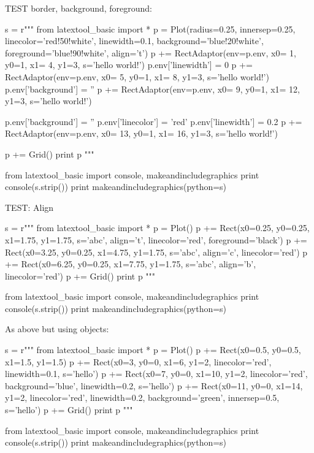 TEST border, background, foreground:
\begin{python}
s = r"""
from latextool_basic import *
p = Plot(radius=0.25, innersep=0.25,
         linecolor='red!50!white', linewidth=0.1,
         background='blue!20!white', foreground='blue!90!white', 
         align='t')
p += RectAdaptor(env=p.env, x0= 1, y0=1, x1= 4, y1=3, s='hello world!')
p.env['linewidth'] = 0
p += RectAdaptor(env=p.env, x0= 5, y0=1, x1= 8, y1=3, s='hello world!')
p.env['background'] = ''
p += RectAdaptor(env=p.env, x0= 9, y0=1, x1= 12, y1=3, s='hello world!')

p.env['background'] = ''
p.env['linecolor'] = 'red'
p.env['linewidth'] = 0.2
p += RectAdaptor(env=p.env, x0= 13, y0=1, x1= 16, y1=3, s='hello world!')

p += Grid()
print p
"""

from latextool_basic import console, makeandincludegraphics
print console(s.strip())
print makeandincludegraphics(python=s)
\end{python}




TEST: Align
\begin{python}
s = r"""
from latextool_basic import *
p = Plot()
p += Rect(x0=0.25, y0=0.25, x1=1.75, y1=1.75, s='abc', align='t', 
          linecolor='red', foreground='black')
p += Rect(x0=3.25, y0=0.25, x1=4.75, y1=1.75, s='abc', align='c', 
          linecolor='red')
p += Rect(x0=6.25, y0=0.25, x1=7.75, y1=1.75, s='abc', align='b', 
          linecolor='red')
p += Grid()
print p
"""

from latextool_basic import console, makeandincludegraphics
print console(s.strip())
print makeandincludegraphics(python=s)
\end{python}



As above but using objects:
\begin{python}
s = r"""
from latextool_basic import *
p = Plot()
p += Rect(x0=0.5, y0=0.5, x1=1.5, y1=1.5)
p += Rect(x0=3, y0=0, x1=6, y1=2, linecolor='red', linewidth=0.1, s='hello')
p += Rect(x0=7, y0=0, x1=10, y1=2, linecolor='red', background='blue', 
          linewidth=0.2, s='hello')
p += Rect(x0=11, y0=0, x1=14, y1=2, linecolor='red', linewidth=0.2,
          background='green',
          innersep=0.5, s='hello')
p += Grid()
print p
"""

from latextool_basic import console, makeandincludegraphics
print console(s.strip())
print makeandincludegraphics(python=s)
\end{python}






